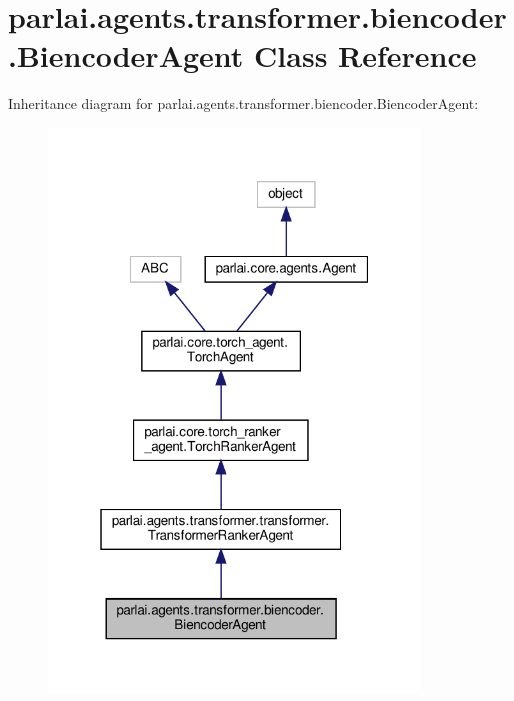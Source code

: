 \hypertarget{classparlai_1_1agents_1_1transformer_1_1biencoder_1_1BiencoderAgent}{}\section{parlai.\+agents.\+transformer.\+biencoder.\+Biencoder\+Agent Class Reference}
\label{classparlai_1_1agents_1_1transformer_1_1biencoder_1_1BiencoderAgent}


Inheritance diagram for parlai.\+agents.\+transformer.\+biencoder.\+Biencoder\+Agent\+:
\nopagebreak
\begin{figure}[H]
\begin{center}
\leavevmode
\includegraphics[width=280pt]{classparlai_1_1agents_1_1transformer_1_1biencoder_1_1BiencoderAgent__inherit__graph}
\end{center}
\end{figure}


